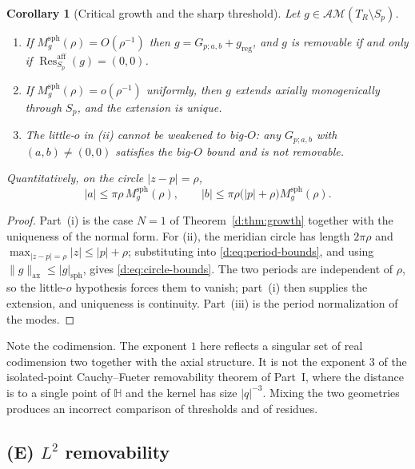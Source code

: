 \documentclass[11pt,a4paper]{article}
\numberwithin{equation}{section}
\newtheorem{corollary}[theorem]{Corollary}
\theoremstyle{definition}
\theoremstyle{remark}
\theoremstyle{plain}
\newcommand{\HH}{\mathbb H}
\newcommand{\AM}{\mathcal{AM}}
\newcommand{\Sp}{S_{p}}
\newcommand{\axn}[1]{\lVert #1\rVert_{\mathrm{ax}}}   %
\newcommand{\Msph}{M^{\mathrm{sph}}}                  %
\newcommand{\Tube}{T}
\newcommand{\abs}[1]{\lvert #1\rvert}
\newcommand{\Resaff}{\operatorname{Res}^{\mathrm{aff}}}
\begin{document}
\begin{corollary}[Critical growth and the sharp threshold]
\label{d:cor:critical}
Let $g\in\AM(\Tube_R\setminus\Sp)$.
\begin{enumerate}[label=\textup{(\roman*)}]
\item If $\Msph_g(\rho)=O(\rho^{-1})$ then $g=G_{p;a,b}+g_{\mathrm{reg}}$,
and $g$ is removable if and only if $\Resaff_{\Sp}(g)=(0,0)$.
\item If $\Msph_g(\rho)=o(\rho^{-1})$ uniformly, then $g$ extends axially
monogenically through $\Sp$, and the extension is unique.
\item The little-$o$ in \textup{(ii)} cannot be weakened to big-$O$: any
$G_{p;a,b}$ with $(a,b)\ne(0,0)$ satisfies the big-$O$ bound and is not
removable.
\end{enumerate}
Quantitatively, on the circle $\abs{z-p}=\rho$,
\begin{equation}
 \abs a\le\pi\rho\,\Msph_g(\rho),
 \qquad
 \abs b\le\pi\rho\bigl(\abs p+\rho\bigr)\Msph_g(\rho).
 \label{d:eq:circle-bounds}
\end{equation}
\end{corollary}

\begin{proof}
Part~(i) is the case $N=1$ of Theorem~\ref{d:thm:growth} together with the
uniqueness of the normal form.  For (ii), the meridian circle has length
$2\pi\rho$ and $\max_{\abs{z-p}=\rho}\abs z\le\abs p+\rho$; substituting
into \eqref{d:eq:period-bounds}, and using
$\axn g\le\abs g_{\mathrm{sph}}$, gives \eqref{d:eq:circle-bounds}.  The
two periods are independent of $\rho$, so the little-$o$ hypothesis forces
them to vanish; part~(i) then supplies the extension, and uniqueness is
continuity.  Part~(iii) is the period normalization of the modes.
\end{proof}

Note the codimension.  The exponent $1$ here reflects a singular set of
real codimension two together with the axial structure.  It is not the
exponent $3$ of the isolated-point Cauchy--Fueter removability theorem of
Part~I, where the distance is to a single point of $\HH$ and the kernel has
size $\abs q^{-3}$.  Mixing the two geometries produces an incorrect
comparison of thresholds and of residues.

\subsection{(E) $L^2$ removability}
\end{document}
